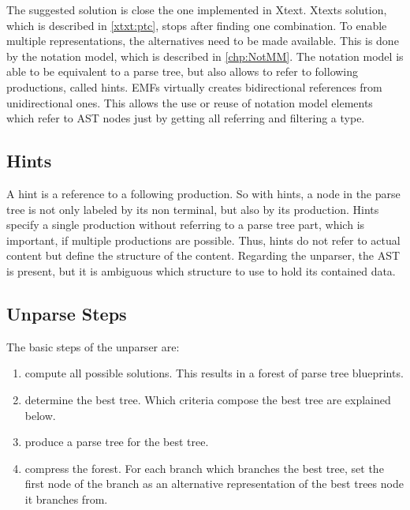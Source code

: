 The suggested solution is close the one implemented in Xtext. Xtexts solution, which is described in \ref{xtxt:ptc}, stops after finding one combination. 
To enable multiple representations, the alternatives need to be made available. This is done by the notation model, which is described in \ref{chp:NotMM}. The notation model is able to be equivalent to a parse tree, but also allows to refer to following productions, called hints. EMFs  virtually creates bidirectional references from unidirectional ones. This allows the use or reuse of notation model elements which refer to AST nodes just by getting all referring  and filtering a type.


\subsection{Hints}
A hint is a reference to a following production. So with hints, a node in the parse tree is not only labeled by its non terminal, but also by its production. Hints specify a single production without referring to a parse tree part, which is important, if multiple productions are possible. Thus, hints do not refer to actual content but define the structure of the content. Regarding the unparser, the AST is present, but it is ambiguous which structure to use to hold its contained data.  

\subsection{Unparse Steps}
The basic steps of the unparser are:
\begin{enumerate}
	\item compute all possible solutions. This results in a forest of parse tree blueprints.
	\item determine the best tree. Which criteria compose the best tree are explained below.
	\item produce a parse tree for the best tree. 
	\item compress the forest. For each branch which branches the best tree, set the first node of the branch as an alternative representation of the best trees node it branches from.\\
\end{enumerate}

